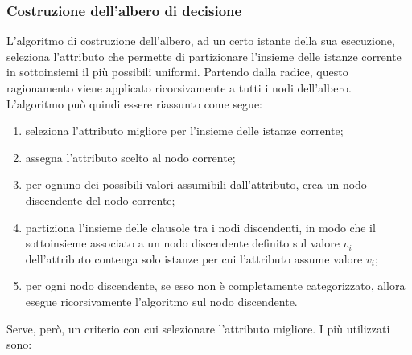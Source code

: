 \subsubsection{Costruzione dell'albero di decisione}
L'algoritmo di costruzione dell'albero, ad un certo istante della sua esecuzione, seleziona l'attributo che permette di partizionare l'insieme delle istanze corrente in sottoinsiemi il più possibili uniformi. Partendo dalla radice, questo ragionamento viene applicato ricorsivamente a tutti i nodi dell'albero.
L'algoritmo può quindi essere riassunto come segue:
\begin{enumerate}
    \item seleziona l'attributo migliore per l'insieme delle istanze corrente;
    \item assegna l'attributo scelto al nodo corrente;
    \item per ognuno dei possibili valori assumibili dall'attributo, crea un nodo discendente del nodo corrente;
    \item partiziona l'insieme delle clausole tra i nodi discendenti, in modo che il sottoinsieme associato a un nodo discendente definito sul valore $v_i$ dell'attributo contenga solo istanze per cui l'attributo assume valore $v_i$;
    \item per ogni nodo discendente, se esso non è completamente categorizzato, allora esegue ricorsivamente l'algoritmo sul nodo discendente.
\end{enumerate}
Serve, però, un criterio con cui selezionare l'attributo migliore. I più utilizzati sono:
